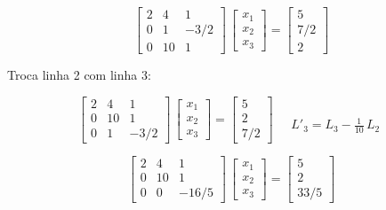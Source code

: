 \begin{example}
\begin{equation}
 \label{cap4:sec2:eq3}
 \left[
 \begin{array}{rrr}
   2 & 4 & 1 \\
   0 & 1 & -3/2 \\
   0 & 10 & 1
 \end{array}
 \right]
 \,
 \left[
 \begin{array}{r}
   x_1 \\
   x_2 \\
   x_3
 \end{array}
 \right]
 =
 \left[
 \begin{array}{r}
   5 \\
   7/2 \\
   2
 \end{array}
 \right]
\end{equation}

Troca linha 2 com linha 3:

\begin{equation}
 \label{cap4:sec2:eq4}
 \left[
 \begin{array}{rrr}
   2 & 4 & 1 \\
   0 & 10 & 1 \\
   0 & 1 & -3/2
 \end{array}
 \right]
 \,
 \left[
 \begin{array}{r}
   x_1 \\
   x_2 \\
   x_3
 \end{array}
 \right]
 =
 \left[
 \begin{array}{r}
   5 \\
   2 \\
   7/2
 \end{array}
 \right]
 \quad
 \begin{array}{l}
   \\
   \\
   L'_3 = L_3 - \frac{1}{10}\,L_2
 \end{array}
\end{equation}

\begin{equation}
 \label{cap4:sec2:eq5}
 \left[
 \begin{array}{rrr}
   2 & 4 & 1 \\
   0 & 10 & 1 \\
   0 & 0 & -16/5
 \end{array}
 \right]
 \,
 \left[
 \begin{array}{r}
   x_1 \\
   x_2 \\
   x_3
 \end{array}
 \right]
 =
 \left[
 \begin{array}{r}
   5 \\
   2 \\
   33/5
 \end{array}
 \right]
\end{equation}


\end{example}
